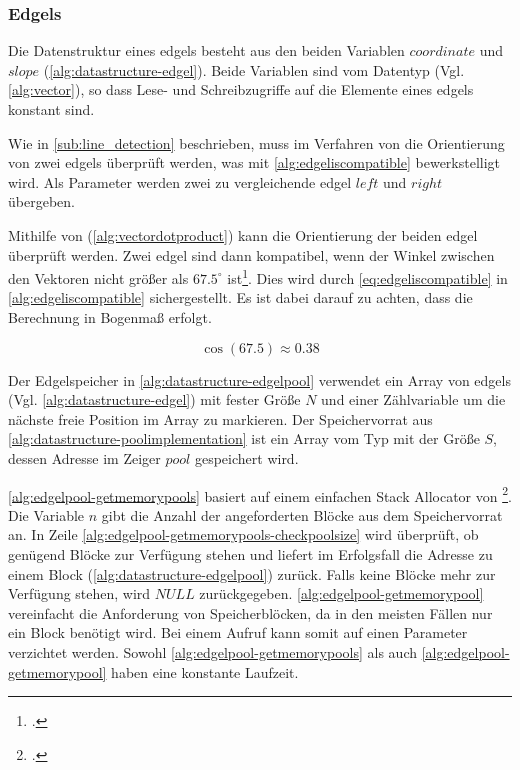 \subsubsection{Edgels} %
\label{sub:datenstruktur-edgels}

Die Datenstruktur eines \glspl{edgel} besteht aus den beiden Variablen $\mathit{coordinate}$ und $\mathit{slope}$
 (\autoref{alg:datastructure-edgel}). Beide Variablen sind vom Datentyp  (Vgl.
 \autoref{alg:vector}), so dass Lese- und Schreibzugriffe auf die Elemente eines \glspl{edgel} konstant sind.



Wie in \autoref{sub:line_detection} beschrieben, muss im Verfahren von \citeauthor{hirzer08} die Orientierung von zwei
 \glspl{edgel} überprüft werden, was mit \autoref{alg:edgeliscompatible} bewerkstelligt wird. Als Parameter werden
 zwei zu vergleichende \gls{edgel} $\mathit{left}$ und $\mathit{right}$ übergeben.



Mithilfe von  (\autoref{alg:vectordotproduct}) kann die Orientierung der beiden \gls{edgel}
 überprüft werden. Zwei \gls{edgel} sind dann kompatibel, wenn der Winkel zwischen den Vektoren nicht größer als
 $67.5^\circ$ ist\footcite[Vgl.][S.~417]{clarke96}. Dies wird durch \autoref{eq:edgeliscompatible} in
 \autoref{alg:edgeliscompatible} sichergestellt. Es ist dabei darauf zu achten, dass die Berechnung in Bogenmaß
 erfolgt.

\begin{equation}
	\label{eq:edgeliscompatible}
	\cos \left(67.5\right) \approx 0.38
\end{equation}

Der Edgelspeicher in \autoref{alg:datastructure-edgelpool} verwendet ein Array von \glspl{edgel}
 (Vgl. \autoref{alg:datastructure-edgel}) mit fester Größe $N$ und einer Zählvariable um die nächste freie Position im
 Array zu markieren. Der Speichervorrat aus \autoref{alg:datastructure-poolimplementation} ist ein Array vom Typ
  mit der Größe $S$, dessen Adresse im Zeiger $\mathit{pool}$ gespeichert wird.



\autoref{alg:edgelpool-getmemorypools} basiert auf einem einfachen Stack Allocator von
 \citeauthor{kr}\footcite[Vgl.][S.~100--104]{kr}. Die Variable $n$ gibt die Anzahl der angeforderten Blöcke aus dem
 Speichervorrat an. In Zeile \ref{alg:edgelpool-getmemorypools-checkpoolsize} wird überprüft, ob genügend Blöcke zur
 Verfügung stehen und liefert im Erfolgsfall die Adresse zu einem Block (\autoref{alg:datastructure-edgelpool}) zurück.
 Falls keine Blöcke mehr zur Verfügung stehen, wird $\mathit{NULL}$ zurückgegeben. \autoref{alg:edgelpool-getmemorypool}
 vereinfacht die Anforderung von Speicherblöcken, da in den meisten Fällen nur ein Block benötigt wird. Bei einem
 Aufruf kann somit auf einen Parameter verzichtet werden. Sowohl \autoref{alg:edgelpool-getmemorypools} als auch
 \autoref{alg:edgelpool-getmemorypool} haben eine konstante Laufzeit.

